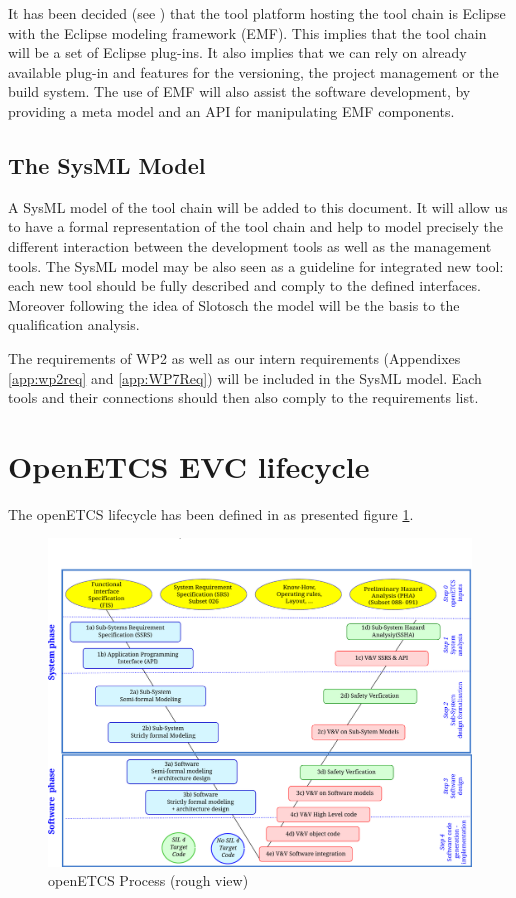 It has been decided (see \cite{D7.1}) that the tool platform hosting
the tool chain is Eclipse with the Eclipse modeling framework
(\gls{EMF}).  This implies that the tool chain will be a set of
Eclipse plug-ins. It also implies that we can rely on already
available plug-in and features for the versioning, the project
management or the build system.  The use of EMF will also assist the
software development, by providing a meta model and an \gls{API} for
manipulating EMF components.


\subsection{The SysML Model}
A SysML model of the tool chain will be added to this document. It
will allow us to have a formal representation of the tool chain and
help to model precisely the different interaction between the
development tools as well as the management tools.  The SysML model
may be also seen as a guideline for integrated new tool: each new tool
should be fully described and comply to the defined interfaces.
Moreover following the idea of Slotosch \cite{slotosch_iso_2012} the
model will be the basis to the qualification analysis.

The requirements of WP2 \cite{baro_requirements_2013} as well as our
intern requirements (Appendixes \ref{app:wp2req} and \ref{app:WP7Req})
will be included in the SysML model. Each tools and their connections
should then also comply to the requirements list.

\section{OpenETCS \gls{EVC} lifecycle}
The openETCS lifecycle has been defined in 
 \cite{D2.3} as  presented figure \ref{fig:openETCSProcess}.
\begin{figure}[htbp]
  \centering
  \includegraphics[width= \textwidth]{images/ProcessOpenETCS}
  \caption{openETCS Process (rough view)}
  \label{fig:openETCSProcess}
\end{figure}

